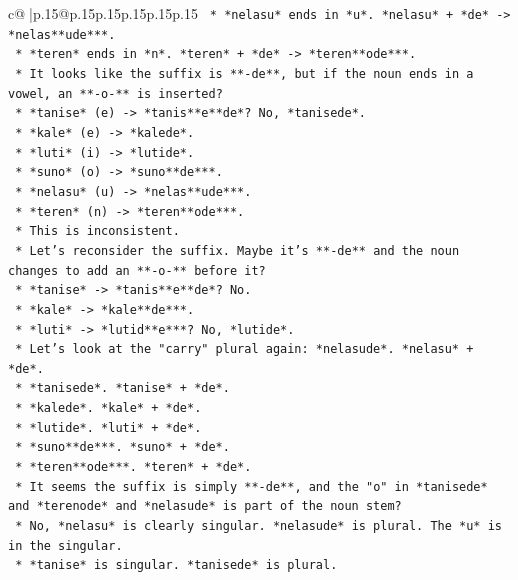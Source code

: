 \documentclass{article}
\begin{document}
{\begin{supertabular}{c@{$\;$}|p{.15\linewidth}@{}p{.15\linewidth}p{.15\linewidth}p{.15\linewidth}p{.15\linewidth}p{.15\linewidth}}
{{{\texttt{            *   *nelasu* ends in *u*. *nelasu* + *de* {-}> *nelas**ude***.} \\
\texttt{            *   *teren* ends in *n*. *teren* + *de* {-}> *teren**ode***.} \\
\texttt{            *   It looks like the suffix is **{-}de**, but if the noun ends in a vowel, an **{-}o{-}** is inserted?} \\
\texttt{                *   *tanise* (e) {-}> *tanis**e**de*? No, *tanisede*.} \\
\texttt{                *   *kale* (e) {-}> *kalede*.} \\
\texttt{                *   *luti* (i) {-}> *lutide*.} \\
\texttt{                *   *suno* (o) {-}> *suno**de***.} \\
\texttt{                *   *nelasu* (u) {-}> *nelas**ude***.} \\
\texttt{                *   *teren* (n) {-}> *teren**ode***.} \\
\texttt{            *   This is inconsistent.} \\
\texttt{            *   Let's reconsider the suffix. Maybe it's **{-}de** and the noun changes to add an **{-}o{-}** before it?} \\
\texttt{                *   *tanise* {-}> *tanis**e**de*? No.} \\
\texttt{                *   *kale* {-}> *kale**de***.} \\
\texttt{                *   *luti* {-}> *lutid**e***? No, *lutide*.} \\
\texttt{            *   Let's look at the "carry" plural again: *nelasude*. *nelasu* + *de*.} \\
\texttt{            *   *tanisede*. *tanise* + *de*.} \\
\texttt{            *   *kalede*. *kale* + *de*.} \\
\texttt{            *   *lutide*. *luti* + *de*.} \\
\texttt{            *   *suno**de***. *suno* + *de*.} \\
\texttt{            *   *teren**ode***. *teren* + *de*.} \\
\texttt{            *   It seems the suffix is simply **{-}de**, and the "o" in *tanisede* and *terenode* and *nelasude* is part of the noun stem?} \\
\texttt{            *   No, *nelasu* is clearly singular. *nelasude* is plural. The *u* is in the singular.} \\
\texttt{            *   *tanise* is singular. *tanisede* is plural.} \\
}}}
\end{supertabular}}
\end{document}
